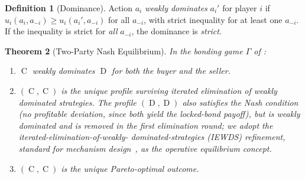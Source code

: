 \documentclass[11pt,a4paper]{article}
\newtheorem{theorem}{Theorem}[section]
\theoremstyle{definition}
\newtheorem{definition}[theorem]{Definition}
\theoremstyle{remark}
\DeclareMathOperator{\Coop}{C}
\DeclareMathOperator{\Def}{D}
\begin{document}
\begin{definition}[Dominance]
\label{def:dominance}
Action $a_i$ \emph{weakly dominates} $a_i'$ for player $i$ if
$u_i(a_i, a_{-i}) \geq u_i(a_i', a_{-i})$ for all $a_{-i}$, with
strict inequality for at least one $a_{-i}$. If the inequality is
strict for \emph{all} $a_{-i}$, the dominance is \emph{strict}.
\end{definition}

\begin{theorem}[Two-Party Nash Equilibrium]
\label{thm:two-party-nash}
In the bonding game $\Gamma$ of :
\begin{enumerate}[label=(\alph*)]
  \item $\Coop$ weakly dominates $\Def$ for both the buyer and
    the seller.
  \item $(\Coop, \Coop)$ is the unique profile surviving iterated
    elimination of weakly dominated strategies. The profile
    $(\Def, \Def)$ also satisfies the Nash condition (no
    \emph{profitable} deviation, since both yield the locked-bond
    payoff), but is weakly dominated and is removed in the first
    elimination round; we adopt the iterated-elimination-of-weakly-
    dominated-strategies (IEWDS) refinement, standard for
    mechanism design~\citep{myerson1979}, as the operative
    equilibrium concept.
  \item $(\Coop, \Coop)$ is the unique Pareto-optimal outcome.
\end{enumerate}
\end{theorem}
\end{document}
